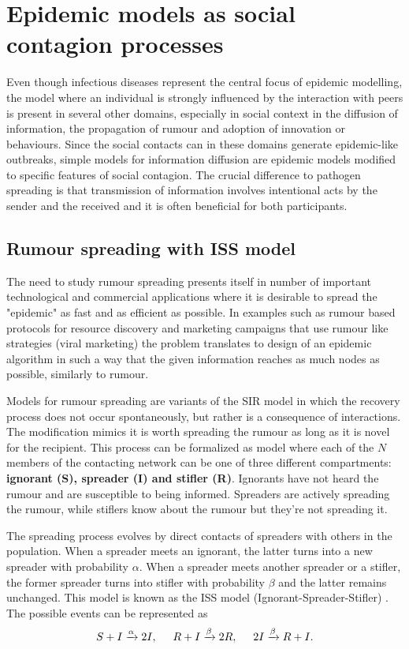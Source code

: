 \documentclass[times, utf8, diplomski]{fer}
\begin{document}
\section{Epidemic models as social contagion processes}
Even though infectious diseases represent the central focus of epidemic modelling, the model where an individual is strongly influenced by the interaction with peers is present in several other domains, especially in social context in the diffusion of information, the propagation of rumour and adoption of innovation or behaviours.  Since the social contacts can in these domains generate epidemic-like outbreaks, simple models for information diffusion are epidemic models modified to specific features of social contagion. The crucial difference to pathogen spreading is that transmission of information involves intentional acts by the sender and the received and it is often beneficial for both participants.

\subsection{Rumour spreading with ISS model}
The need to study rumour spreading presents itself in number of important technological and commercial applications where it is desirable to spread the "epidemic" as fast and as efficient as possible.  In examples such as rumour based protocols for resource discovery and marketing campaigns that use rumour like strategies (viral marketing)  the problem translates to design of an epidemic algorithm in such a way that the given information reaches as much nodes as possible, similarly to rumour.
 

Models for rumour spreading are variants of the SIR model in which the recovery process does not occur spontaneously, but rather is a consequence of interactions. The modification mimics it is worth spreading the rumour as long as it is novel for the recipient. This process can be formalized as model where each of the $N$ members of the contacting network can be one of three different compartments: \textbf{ignorant (S), spreader (I) and stifler (R)}. Ignorants have not heard the rumour and are susceptible to being informed. Spreaders are actively spreading the rumour, while stiflers know about the rumour but they're not  spreading it.
 
The spreading process evolves by direct contacts of spreaders with others in the population. When a spreader meets an ignorant, the latter turns into a new spreader with probability $\alpha$. When a spreader meets another spreader or a stifler, the former spreader turns into stifler with probability $\beta$ and the latter remains unchanged. This model is known as the ISS model (Ignorant-Spreader-Stifler) \cite{Moreno2004}. The possible events can be represented as 
\begin{equation*}
S + I \xrightarrow{\alpha} 2I,\hspace{5mm}  R + I \xrightarrow{\beta} 2R,  \hspace{5mm} 2I \xrightarrow{\beta} R + I.
\end{equation*}
\end{document}
